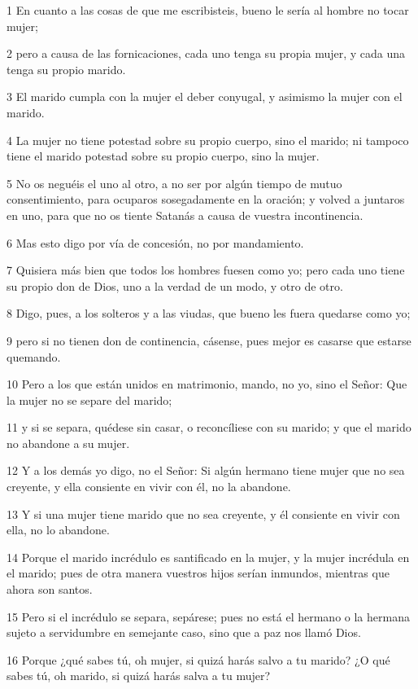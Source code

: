\par 1 En cuanto a las cosas de que me escribisteis, bueno le sería al hombre no tocar mujer;
\par 2 pero a causa de las fornicaciones, cada uno tenga su propia mujer, y cada una tenga su propio marido.
\par 3 El marido cumpla con la mujer el deber conyugal, y asimismo la mujer con el marido.
\par 4 La mujer no tiene potestad sobre su propio cuerpo, sino el marido; ni tampoco tiene el marido potestad sobre su propio cuerpo, sino la mujer.
\par 5 No os neguéis el uno al otro, a no ser por algún tiempo de mutuo consentimiento, para ocuparos sosegadamente en la oración; y volved a juntaros en uno, para que no os tiente Satanás a causa de vuestra incontinencia.
\par 6 Mas esto digo por vía de concesión, no por mandamiento.
\par 7 Quisiera más bien que todos los hombres fuesen como yo; pero cada uno tiene su propio don de Dios, uno a la verdad de un modo, y otro de otro.
\par 8 Digo, pues, a los solteros y a las viudas, que bueno les fuera quedarse como yo;
\par 9 pero si no tienen don de continencia, cásense, pues mejor es casarse que estarse quemando.
\par 10 Pero a los que están unidos en matrimonio, mando, no yo, sino el Señor: Que la mujer no se separe del marido;
\par 11 y si se separa, quédese sin casar, o reconcíliese con su marido; y que el marido no abandone a su mujer.
\par 12 Y a los demás yo digo, no el Señor: Si algún hermano tiene mujer que no sea creyente, y ella consiente en vivir con él, no la abandone.
\par 13 Y si una mujer tiene marido que no sea creyente, y él consiente en vivir con ella, no lo abandone.
\par 14 Porque el marido incrédulo es santificado en la mujer, y la mujer incrédula en el marido; pues de otra manera vuestros hijos serían inmundos, mientras que ahora son santos.
\par 15 Pero si el incrédulo se separa, sepárese; pues no está el hermano o la hermana sujeto a servidumbre en semejante caso, sino que a paz nos llamó Dios.
\par 16 Porque ¿qué sabes tú, oh mujer, si quizá harás salvo a tu marido? ¿O qué sabes tú, oh marido, si quizá harás salva a tu mujer?
